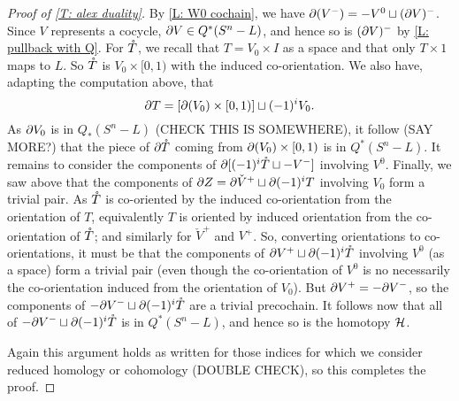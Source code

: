 \begin{example}
\begin{proof}[Proof of \cref{T: alex duality}]
By \cref{L: W0 cochain}, we have $\partial(V^-) = -V^0 \sqcup (\partial V)^-$.
Since $V$ represents a cocycle, $\partial V \in Q^*(S^n-L)$, and hence so is $(\partial V)^-$ by \cref{L: pullback with Q}.
For $\mathring{T}$, we recall that $T = V_0 \times I$ as a space and that only $T \times 1$ maps to $L$.
So $\mathring{T}$ is $V_0 \times [0,1)$ with the induced co-orientation.
We also have, adapting the computation above, that
$$\partial T = [\partial (V_0) \times [0,1)] \sqcup (-1)^i V_0.$$
As $\partial V_0$ is in $Q_*(S^n-L)$ (CHECK THIS IS SOMEWHERE), it follow (SAY MORE?) that the piece of $\partial \mathring{T}$ coming from $\partial (V_0) \times [0,1)$ is in $Q^*(S^n-L)$.
It remains to consider the components of $\partial[ (-1)^i\mathring{T} \sqcup - V^-]$ involving $V^0$.
Finally, we saw above that the components of $\partial Z = \partial \check V^+ \sqcup \partial (-1)^i T$ involving $V_0$ form a trivial pair.
As $\mathring{T}$ is co-oriented by the induced co-orientation from the orientation of $T$, equivalently $T$ is oriented by induced orientation from the co-orientation of $\mathring{T}$; and similarly for $\check V^+$ and $V^+$.
So, converting orientations to co-orientations, it must be that the components of $\partial V^+ \sqcup \partial (-1)^i \mathring{T}$ involving $V^0$ (as a space) form a trivial pair (even though the co-orientation of $V^0$ is no necessarily the co-orientation induced from the orientation of $V_0$).
But $\partial V^+ = - \partial V^-$, so the components of $-\partial V^- \sqcup \partial (-1)^i \mathring{T}$ are a trivial precochain.
It follows now that all of $-\partial V^- \sqcup \partial (-1)^i \mathring{T}$ is in $Q^*(S^n-L)$, and hence so is the homotopy $\mathcal{H}$.

\begin{comment}

we need to consider the co-orientation of the the piece of $\bd \mr T$ corresponding to $V^0$.
We have


Once again,
\begin{itemize}
\item the $V^0$ terms should cancel once I get the signs right,
\item since $\bd V \in Q^*(S^n-L)$ it follows that $(\bd V)^-$ and $\bd V^0=-(\bd V)^0$ are in $Q^*(S^n-L)$,
\item and then $\bd V^0 \times [0,1) \in Q^*(S^n-L)$ since the homotopy is universal.
\end{itemize}
\end{comment}

Again this argument holds as written for those indices for which we consider reduced homology or cohomology (DOUBLE CHECK), so this completes the proof.
\end{proof}





\end{example}
